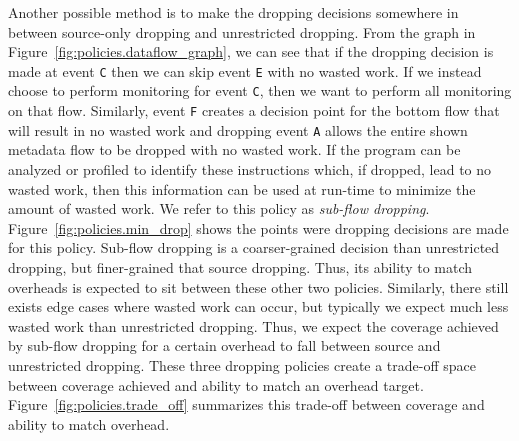 Another possible method is to make the dropping decisions somewhere in between
source-only dropping and unrestricted dropping. From the graph in 
Figure~\ref{fig:policies.dataflow_graph}, we can see that if the dropping
decision is made at event {\tt C} then we can skip event {\tt E} with no wasted
work. If we instead choose to perform monitoring for event {\tt C}, then we want to perform all
monitoring on that flow. Similarly, event {\tt F} creates a decision point for
the bottom flow that will result in no wasted work and dropping event {\tt A}
allows the entire shown metadata flow to be dropped with no wasted work. If the
program can be
analyzed or profiled to identify these instructions which, if dropped, lead to
no wasted work, then this information can be used at run-time to minimize the
amount of wasted work. We refer to this policy as \emph{sub-flow dropping}.
Figure~\ref{fig:policies.min_drop} shows the points were dropping decisions are
made for this policy.
Sub-flow dropping is a coarser-grained decision than unrestricted dropping, but
finer-grained that source dropping. Thus, its ability to match overheads is
expected to sit between these other two policies. Similarly, there still exists
edge cases where wasted work can occur, but typically we expect much less
wasted work than unrestricted 
dropping. Thus, we expect the coverage achieved by sub-flow dropping for a
certain overhead to fall between source and unrestricted dropping. These three
dropping policies create a trade-off space between coverage achieved and
ability to match an overhead target.
Figure~\ref{fig:policies.trade_off} summarizes this trade-off between coverage
and ability to match overhead.
